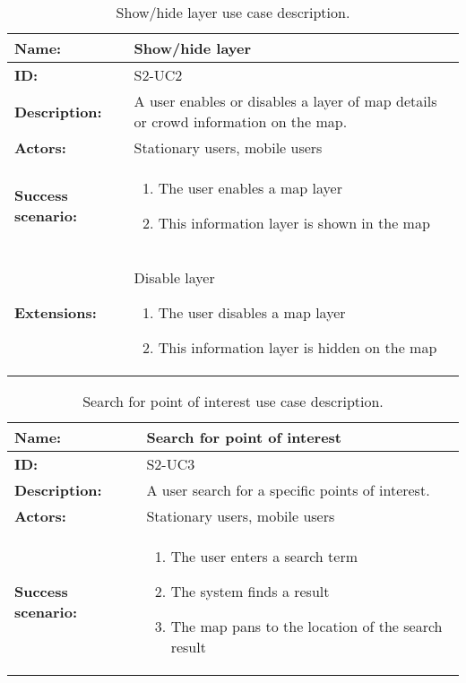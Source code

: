 \begin{table}[htbp]
    \centering
    \begin{tabularx}{\textwidth}{lX}
        \toprule
        \textbf{Name:}  & Show/hide layer \\ \midrule
        \textbf{ID:}    & S2-UC2 \\ \midrule
        \textbf{Description:} & A user enables or disables a layer of map details or crowd information on the map. \\ \midrule
        \textbf{Actors:} & Stationary users, mobile users \\ \midrule
        \textbf{Success scenario:} & 
        \begin{enumerate}
            \item The user enables a map layer
            \item This information layer is shown in the map
        \end{enumerate}
        \\ \midrule
        \textbf{Extensions:} & Disable layer 
        \begin{enumerate}
            \item The user disables a map layer
            \item This information layer is hidden on the map
        \end{enumerate}
        \\ \bottomrule
    \end{tabularx}
    \caption{Show/hide layer use case description.}
    \label{tab:s2-uc2}
\end{table}

\begin{table}[htbp]
    \centering
    \begin{tabularx}{\textwidth}{lX}
        \toprule
        \textbf{Name:}  & Search for point of interest \\ \midrule
        \textbf{ID:}    & S2-UC3 \\ \midrule
        \textbf{Description:} & A user search for a specific points of interest. \\ \midrule
        \textbf{Actors:} & Stationary users, mobile users \\ \midrule
        \textbf{Success scenario:} & 
        \begin{enumerate}
            \item The user enters a search term
            \item The system finds a result
            \item The map pans to the location of the search result
        \end{enumerate}
        \\ \bottomrule
    \end{tabularx}
    \caption{Search for point of interest use case description.}
    \label{tab:s2-uc3}
\end{table}

